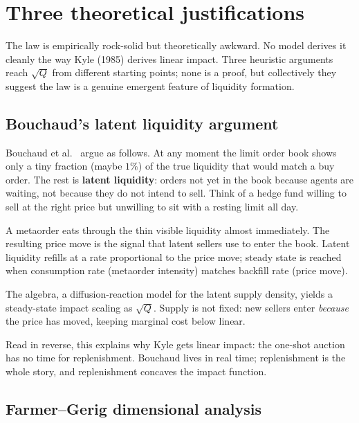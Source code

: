 \section{Three theoretical justifications}
\label{sec:three_justifications}

The law is empirically rock-solid but theoretically awkward. No
model derives it cleanly the way Kyle (1985) derives linear impact.
Three heuristic arguments reach $\sqrt{Q}$ from different starting
points; none is a proof, but collectively they suggest the law is a
genuine emergent feature of liquidity formation.

\subsection{Bouchaud's latent liquidity argument}
\label{subsec:bouchaud_latent}

Bouchaud et al.\ \citeBouchaud{} argue as follows. At any moment the
limit order book shows only a tiny fraction (maybe $1\%$) of
the true liquidity that would match a buy order. The rest is
\textbf{latent liquidity}: orders not yet in the book because agents
are waiting, not because they do not intend to sell. Think of a
hedge fund willing to sell at the right price but unwilling to sit
with a resting limit all day.

A metaorder eats through the thin visible liquidity almost
immediately. The resulting price move is the signal that latent
sellers use to enter the book. Latent liquidity refills at a rate
proportional to the price move; steady state is reached when
consumption rate (metaorder intensity) matches backfill rate (price
move).

The algebra, a diffusion-reaction model for the latent supply
density, yields a steady-state impact scaling as $\sqrt{Q}$.
Supply is not fixed: new sellers enter \emph{because} the price has
moved, keeping marginal cost below linear.

Read in reverse, this explains why Kyle gets linear impact: the
one-shot auction has no time for replenishment. Bouchaud lives in
real time; replenishment is the whole story, and replenishment
concaves the impact function.

\subsection{Farmer--Gerig dimensional analysis}
\label{subsec:farmer_dimensional}

